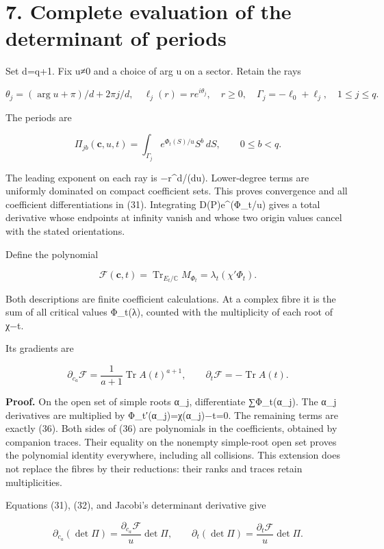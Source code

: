 \documentclass[
  11pt,
]{article}
\begin{document}
\section{7. Complete evaluation of the determinant of
periods}\label{complete-evaluation-of-the-determinant-of-periods}

Set d=q+1. Fix u≠0 and a choice of arg u on a sector. Retain the rays

\[
\theta_j=(\arg u+\pi)/d+2\pi j/d,
\quad\ell_j(r)=re^{i\theta_j},\quad r\ge0,
\quad\Gamma_j=-\ell_0+\ell_j,\quad1\le j\le q.
\tag{33}
\]

The periods are

\[
\Pi_{jb}(\mathbf c,u,t)=\int_{\Gamma_j}e^{\Phi_t(S)/u}S^b\,dS,
\qquad0\le b<q.
\tag{34}
\]

The leading exponent on each ray is −r\^{}d/(d\textbar u\textbar).
Lower-degree terms are uniformly dominated on compact coefficient sets.
This proves convergence and all coefficient differentiations in (31).
Integrating D(P)e\^{}(Φ\_t/u) gives a total derivative whose endpoints
at infinity vanish and whose two origin values cancel with the stated
orientations.

Define the polynomial

\[
\boxed{\mathcal F(\mathbf c,t)
 =\operatorname{Tr}_{E_t/\mathbb C}M_{\Phi_t}
 =\lambda_t(\chi'\Phi_t).}
\tag{35}
\]

Both descriptions are finite coefficient calculations. At a complex
fibre it is the sum of all critical values Φ\_t(λ), counted with the
multiplicity of each root of χ−t.

Its gradients are

\[
\boxed{
\partial_{c_a}\mathcal F
 =\frac1{a+1}\operatorname{Tr}A(t)^{a+1},
\qquad
\partial_t\mathcal F=-\operatorname{Tr}A(t).
}
\tag{36}
\]

\textbf{Proof.} On the open set of simple roots α\_j, differentiate
∑Φ\_t(α\_j). The α\_j derivatives are multiplied by
Φ\_t′(α\_j)=χ(α\_j)−t=0. The remaining terms are exactly (36). Both
sides of (36) are polynomials in the coefficients, obtained by companion
traces. Their equality on the nonempty simple-root open set proves the
polynomial identity everywhere, including all collisions. This extension
does not replace the fibres by their reductions: their ranks and traces
retain multiplicities.

Equations (31), (32), and Jacobi's determinant derivative give

\[
\partial_{c_a}(\det\Pi)
 =\frac{\partial_{c_a}\mathcal F}u\det\Pi,
\qquad
\partial_t(\det\Pi)
 =\frac{\partial_t\mathcal F}u\det\Pi.
\tag{37}
\]
\end{document}
